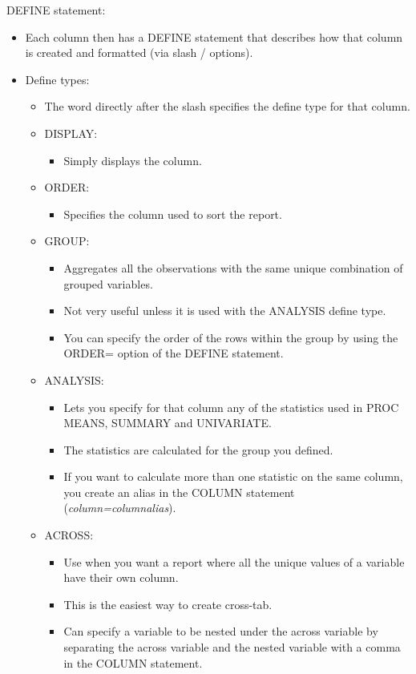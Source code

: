 \documentclass[11pt, oneside]{article}
\begin{document}
DEFINE statement:
\begin{itemize}
\item Each column then has a DEFINE statement that describes how that column is created and formatted (via slash / options).
\item Define types:
	\begin{itemize}
	\item The word directly after the slash specifies the define type for that column.
	\item DISPLAY:
		\begin{itemize}
		\item Simply displays the column.
		\end{itemize}
	\item ORDER:
		\begin{itemize}
		\item Specifies the column used to sort the report. 
		\end{itemize} 
	\item GROUP:
		\begin{itemize}
		\item Aggregates all the observations with the same unique combination of grouped variables.
		\item Not very useful unless it is used with the ANALYSIS define type.
		\item You can specify the order of the rows within the group by using the ORDER= option of the DEFINE statement.
		\end{itemize}
	\item ANALYSIS:
		\begin{itemize}
		\item Lets you specify for that column any of the statistics used in PROC MEANS, SUMMARY and UNIVARIATE.
		\item The statistics are calculated for the group you defined.
		\item If you want to calculate more than one statistic on the same column, you create an alias in the COLUMN statement (\textit{column=columnalias}). 
		\end{itemize}
	\item ACROSS:
		\begin{itemize}
		\item Use when you want a report where all the unique values of a variable have their own column.
		\item This is the easiest way to create cross-tab.
		\item Can specify a variable to be nested under the across variable by separating the across variable and the nested variable with a comma in the COLUMN statement.

\end{itemize}
\end{itemize}
\end{itemize}
\end{document}
